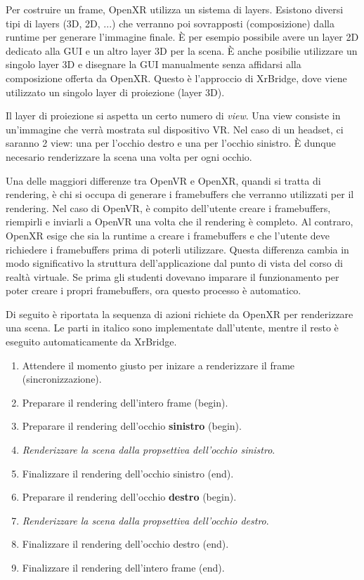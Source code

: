 \documentclass[twoside]{supsistudent}
\begin{document}
Per costruire un frame, OpenXR utilizza un sistema di layers. Esistono diversi tipi di layers (3D, 2D, ...) che verranno poi sovrapposti (composizione) dalla runtime per generare l'immagine finale. È per esempio possibile avere un layer 2D dedicato alla GUI e un altro layer 3D per la scena. È anche posibilie utilizzare un singolo layer 3D e disegnare la GUI manualmente senza affidarsi alla composizione offerta da OpenXR. Questo è l'approccio di XrBridge, dove viene utilizzato un singolo layer di proiezione (layer 3D).

Il layer di proiezione si aspetta un certo numero di \textit{view}. Una view consiste in un'immagine che verrà mostrata sul dispositivo VR. Nel caso di un headset, ci saranno 2 view: una per l'occhio destro e una per l'occhio sinistro. È dunque necesario renderizzare la scena una volta per ogni occhio.

Una delle maggiori differenze tra OpenVR e OpenXR, quandi si tratta di rendering, è chi si occupa di generare i framebuffers che verranno utilizzati per il rendering. Nel caso  di OpenVR, è compito dell'utente creare i framebuffers, riempirli e inviarli a OpenVR una volta che il rendering è completo. Al contraro, OpenXR esige che sia la runtime a creare i framebuffers e che l'utente deve richiedere i framebuffers prima di poterli utilizzare. Questa differenza cambia in modo significativo la struttura dell'applicazione dal punto di vista del corso di realtà virtuale. Se prima gli studenti dovevano imparare il funzionamento per poter creare i propri framebuffers, ora questo processo è automatico.

Di seguito è riportata la sequenza di azioni richiete da OpenXR per renderizzare una scena. Le parti in italico sono implementate dall'utente, mentre il resto è eseguito automaticamente da XrBridge.

\begin{enumerate}
  \item Attendere il momento giusto per inizare a renderizzare il frame (sincronizzazione).

  \item Preparare il rendering dell'intero frame (begin).

  \item Preparare il rendering dell'occhio \textbf{sinistro} (begin).
  \item \textit{Renderizzare la scena dalla propsettiva dell'occhio sinistro}.
  \item Finalizzare il rendering dell'occhio sinistro (end).

  \item Preparare il rendering dell'occhio \textbf{destro} (begin).
  \item \textit{Renderizzare la scena dalla propsettiva dell'occhio destro}.
  \item Finalizzare il rendering dell'occhio destro (end).

  \item Finalizzare il rendering dell'intero frame (end).
\end{enumerate}
\end{document}
